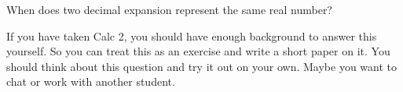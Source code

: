   When does two decimal expansion represent the same real number?

If you have taken Calc 2, you should have enough background to answer
this yourself.
So you can treat this as an exercise and write a short paper on it.
You should think about this question and try it out on your own.
Maybe you want to chat or work with another student.
